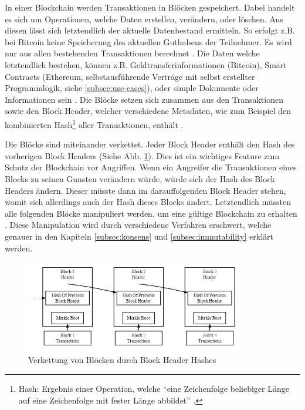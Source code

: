In einer Blockchain werden Transaktionen in Blöcken gespeichert. Dabei handelt es sich um Operationen, welche Daten erstellen, verändern, oder löschen. Aus diesen lässt sich letztendlich der aktuelle Datenbestand ermitteln. So erfolgt z.B. bei Bitcoin keine Speicherung des aktuellen Guthabens der Teilnehmer. Es wird nur aus allen bestehenden Transaktionen berechnet \cite{AntonopoulosMasteringbitcoin2015}. Die Daten welche letztendlich bestehen, können z.B. Geldtransferinformationen (Bitcoin), Smart Contracts (Ethereum, selbstausführende Verträge mit selbst erstellter Programmlogik, siehe \ref{subsec:use-cases}), oder simple Dokumente oder Informationen sein \cite{EthereumWhitepaper2017}\cite{NakamotoBitcoinPeertoPeerElectronic2008}\cite{HyperledgerFabricTeamHyperledgerWhitepaper2016}. Die Blöcke setzen sich zusammen aus den Transaktionen sowie den Block Header, welcher verschiedene Metadaten, wie zum Beispiel den kombinierten Hash\footnote{Hash: Ergebnis einer Operation, welche ``eine Zeichenfolge beliebiger Länge auf eine Zeichenfolge mit fester Länge abbildet'' \cite{KryptologischeHashfunktion2017}.} aller Transaktionen, enthält \cite{AntonopoulosMasteringbitcoin2015}.

Die Blöcke sind miteinander verkettet. Jeder Block Header enthält den Hash  des vorherigen Block Headers (Siehe Abb. \ref{fig:block-chain}). Dies ist ein wichtiges Feature zum Schutz der Blockchain vor Angriffen. Wenn ein Angreifer die Transaktionen eines Blocks zu seinen Gunsten verändern würde, würde sich der Hash des Block Headers ändern. Dieser müsste dann im darauffolgenden Block Header stehen, womit sich allerdings auch der Hash dieses Blocks ändert. Letztendlich müssten alle folgenden Blöcke manipuliert werden, um eine gültige Blockchain zu erhalten \cite{NakamotoBitcoinPeertoPeerElectronic2008}. Diese Manipulation wird durch verschiedene Verfahren erschwert, welche genauer in den Kapiteln \ref{subsec:konsens} und \ref{subsec:immutability} erklärt werden.

\begin{figure}[htb]
  \centering
	\includegraphics[width=0.85\textwidth,angle=0]{images/block-chain}
 	\caption{Verkettung von Blöcken durch Block Header Hashes}
	\label{fig:block-chain}
\end{figure}

